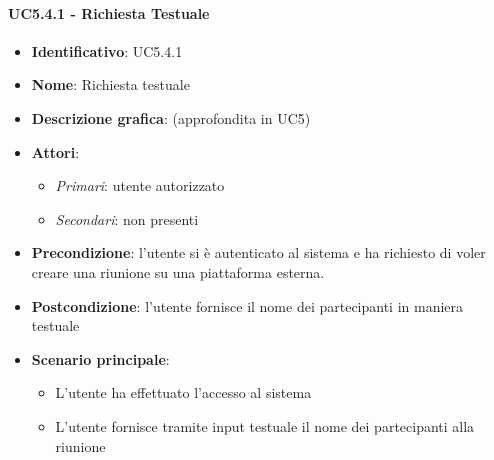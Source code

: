 \paragraph{UC5.4.1 - Richiesta Testuale}
\begin{itemize}
   \item \textbf{Identificativo}: UC5.4.1
   \item \textbf{Nome}: Richiesta testuale
   \item \textbf{Descrizione grafica}: (approfondita in UC5)
   \item \textbf{Attori}:
   \begin{itemize} 
       \item \textit{Primari}: utente autorizzato
       \item \textit{Secondari}: non presenti
   \end{itemize}
       \item \textbf{Precondizione}: l'utente si è autenticato al sistema e ha richiesto di voler creare una riunione su una piattaforma esterna.
       \item \textbf{Postcondizione}: l'utente fornisce il nome dei partecipanti in maniera testuale
    \item \textbf{Scenario principale}: 
       \begin{itemize}
           \item L'utente ha effettuato l'accesso al sistema 
           \item L'utente fornisce tramite input testuale il nome dei partecipanti alla riunione
       \end{itemize}
\end{itemize}

